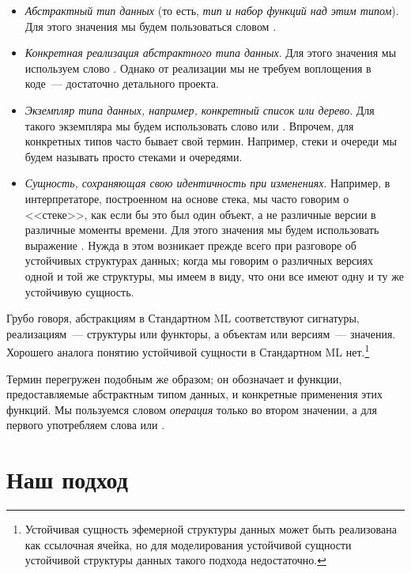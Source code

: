 \begin{itemize}
\item \emph{Абстрактный тип данных} (то есть,
  \emph{тип и набор функций над этим типом}). Для этого значения мы
  будем пользоваться словом .
\item \emph{Конкретная реализация абстрактного типа данных}. Для этого
  значения мы используем слово
  . Однако от реализации мы не требуем
  воплощения в коде~--- достаточно детального проекта.
\item \emph{Экземпляр типа данных, например, конкретный список или
    дерево}. Для такого экземпляра мы будем использовать слово
   или . Впрочем,
  для конкретных типов часто бывает свой термин. Например, стеки и
  очереди мы будем называть просто стеками и очередями.
\item \emph{Сущность, сохраняющая свою идентичность при
    изменениях}. Например, в интерпретаторе, построенном на основе
  стека, мы часто говорим о <<стеке>>, как если бы это был один
  объект, а не различные версии в различные моменты времени. Для этого
  значения мы будем использовать выражение .  Нужда в этом возникает прежде
  всего при разговоре об устойчивых структурах данных; когда мы
  говорим о различных версиях одной и той же структуры, мы имеем в
  виду, что они все имеют одну и ту же устойчивую сущность.
\end{itemize}
Грубо говоря, абстракциям в Стандартном ML соответствуют сигнатуры,
реализациям~--- структуры или функторы, а объектам или версиям~---
значения. Хорошего аналога понятию устойчивой сущности в Стандартном
ML нет.\footnote{%
  Устойчивая сущность эфемерной структуры данных может быть
  реализована как ссылочная ячейка, но для моделирования устойчивой
  сущности устойчивой структуры данных такого подхода недостаточно.
}

Термин  перегружен подобным же образом; он
обозначает и функции, предоставляемые абстрактным типом данных, и
конкретные применения этих функций. Мы пользуемся словом
\emph{операция} только во втором значении, а для первого употребляем
слова  или .

\section{Наш подход}

